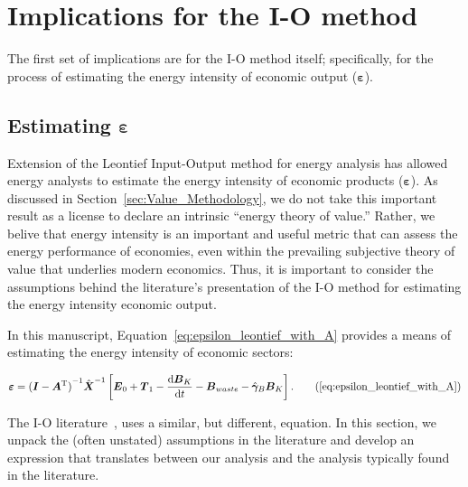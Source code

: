 \section{Implications for the I-O method}
\label{sec:Implications_for_IO}

The first set of implications are for the I-O method itself;
specifically, for the process of estimating
the energy intensity of economic output ($\bm{\varepsilon}$).


\subsection{Estimating $\bm{\varepsilon}$}
\label{sec:estimating_epsilon-implications_chapter}

Extension of the Leontief 
Input-Output method
for energy analysis has allowed energy analysts to estimate 
the energy intensity
of economic products ($\bm{\varepsilon}$). 
As discussed in Section~\ref{sec:Value_Methodology},
we do not take this important result as a license
to declare an intrinsic ``energy theory of value.''
Rather, we belive that energy intensity is an 
important and useful metric that can assess 
the energy performance of economies,
even within the prevailing subjective theory of value
that underlies modern economics. 
Thus, it is important to consider the assumptions behind
the literature's presentation of the I-O method 
for estimating the energy intensity economic output.

In this manuscript, Equation~\ref{eq:epsilon_leontief_with_A} 
provides a means of estimating the energy intensity of economic sectors:

\begin{equation}
	\bm{\varepsilon} 
	= {(\vec{I} - \vec{A}^{\mathrm{T}})}^{-1}\hat{\vec{X}}^{-1}
		\left[\vec{E}_{0} 
				+ \vec{T}_{1} 
				- \frac{\mathrm{d}\vec{B}_{K}}{\mathrm{d}t} 
				- \vec{B}_{waste}
				- \hat{\bm{\gamma}}_{B}\vec{B}_{K}
		\right].\tag{\ref{eq:epsilon_leontief_with_A}}
\end{equation}

\noindent{}The I-O literature~\cite{Bullard1975,Casler1984}, 
uses a similar, but different, equation. 
In this section, we unpack the (often unstated) assumptions in the literature
and develop an expression that translates
between our analysis and the analysis typically found in the literature. 

